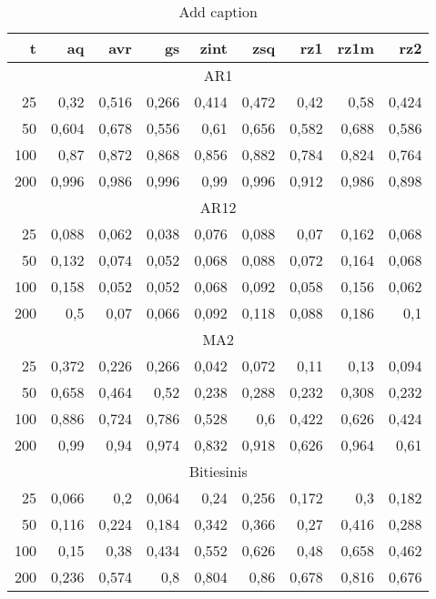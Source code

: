 \begin{table}[htbp]
  \centering
  \caption{Add caption}
    \begin{tabular}{rrrrrrrrr}
    \toprule
    t     & aq    & avr   & gs    & zint  & zsq   & rz1   & rz1m  & rz2 \\
    \midrule
    \multicolumn{9}{c}{AR1} \\
    25    & 0,32  & 0,516 & 0,266 & 0,414 & 0,472 & 0,42  & 0,58  & 0,424 \\
    50    & 0,604 & 0,678 & 0,556 & 0,61  & 0,656 & 0,582 & 0,688 & 0,586 \\
    100   & 0,87  & 0,872 & 0,868 & 0,856 & 0,882 & 0,784 & 0,824 & 0,764 \\
    200   & 0,996 & 0,986 & 0,996 & 0,99  & 0,996 & 0,912 & 0,986 & 0,898 \\
    \multicolumn{9}{c}{AR12} \\
    25    & 0,088 & 0,062 & 0,038 & 0,076 & 0,088 & 0,07  & 0,162 & 0,068 \\
    50    & 0,132 & 0,074 & 0,052 & 0,068 & 0,088 & 0,072 & 0,164 & 0,068 \\
    100   & 0,158 & 0,052 & 0,052 & 0,068 & 0,092 & 0,058 & 0,156 & 0,062 \\
    200   & 0,5   & 0,07  & 0,066 & 0,092 & 0,118 & 0,088 & 0,186 & 0,1 \\
    \multicolumn{9}{c}{MA2} \\
    25    & 0,372 & 0,226 & 0,266 & 0,042 & 0,072 & 0,11  & 0,13  & 0,094 \\
    50    & 0,658 & 0,464 & 0,52  & 0,238 & 0,288 & 0,232 & 0,308 & 0,232 \\
    100   & 0,886 & 0,724 & 0,786 & 0,528 & 0,6   & 0,422 & 0,626 & 0,424 \\
    200   & 0,99  & 0,94  & 0,974 & 0,832 & 0,918 & 0,626 & 0,964 & 0,61 \\
    \multicolumn{9}{c}{Bitiesinis} \\
    25    & 0,066 & 0,2   & 0,064 & 0,24  & 0,256 & 0,172 & 0,3   & 0,182 \\
    50    & 0,116 & 0,224 & 0,184 & 0,342 & 0,366 & 0,27  & 0,416 & 0,288 \\
    100   & 0,15  & 0,38  & 0,434 & 0,552 & 0,626 & 0,48  & 0,658 & 0,462 \\
    200   & 0,236 & 0,574 & 0,8   & 0,804 & 0,86  & 0,678 & 0,816 & 0,676 \\
    \bottomrule
    \end{tabular}%
  \label{tab:addlabel}%
\end{table}%
